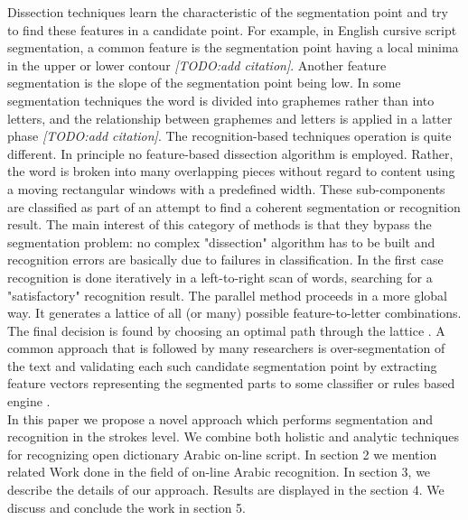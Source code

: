 \documentclass[journal,compsoc]{IEEEtran}
\begin{document}
Dissection techniques learn the characteristic of the segmentation point and try to find these features in a candidate point. For example, in English cursive script segmentation, a common feature is the segmentation point having a local minima in the upper or lower contour \emph{[TODO:add citation]}. Another feature segmentation is the slope of the segmentation point being low. In some segmentation techniques the word is divided into graphemes rather than into letters, and the relationship between graphemes and letters is applied in a latter phase \emph{[TODO:add citation]}. The recognition-based techniques operation is quite different. In principle no feature-based dissection algorithm is employed. Rather, the word is broken into many overlapping pieces without regard to content using a moving rectangular windows with a predefined width. These sub-components are classified as part of an attempt to find a coherent segmentation or recognition result. The main interest of this category of methods is that they bypass the segmentation problem: no complex "dissection" algorithm has to be built and recognition errors are basically due to failures in classification.  In the first case recognition is done iteratively in a left-to-right scan of words, searching for a "satisfactory" recognition result. The parallel method proceeds in a more global way. It generates a lattice of all (or many) possible feature-to-letter combinations. The final decision is found by choosing an optimal path through the lattice \cite{casey1996survey}. A common approach that is followed by many researchers is over-segmentation of the text and validating each such candidate segmentation point by extracting feature vectors representing the segmented parts to some classifier or rules based engine \cite{daifallah2009recognition}.\\

In this paper we propose a novel approach which performs segmentation and recognition in the strokes level. We combine both holistic and analytic techniques for recognizing open dictionary Arabic on-line script. In section 2 we mention related Work done in the field of on-line Arabic recognition. In section 3, we describe the details of our approach. Results are displayed in the section 4. We discuss and conclude the work in section 5.
\end{document}
